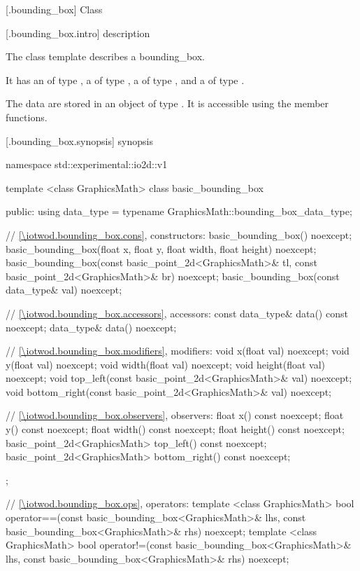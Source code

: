  [\iotwod.bounding_box] {Class }

 [\iotwod.bounding_box.intro] { description}

%
\pnum
The class template  describes a bounding_box.

\pnum
It has an  of type , a  of type , a  of type , and a  of type .

\pnum
The data are stored in an object of type . It is accessible using the  member functions.

 [\iotwod.bounding_box.synopsis] { synopsis}

\begin{codeblock}
namespace std::experimental::io2d::v1 {
  template <class GraphicsMath>
  class basic_bounding_box {
  public:
    using data_type = typename GraphicsMath::bounding_box_data_type;
    
    // \ref{\iotwod.bounding_box.cons}, constructors:
    basic_bounding_box() noexcept;
    basic_bounding_box(float x, float y, float width, float height) noexcept;
    basic_bounding_box(const basic_point_2d<GraphicsMath>& tl,
      const basic_point_2d<GraphicsMath>& br) noexcept;
    basic_bounding_box(const data_type& val) noexcept;

    // \ref{\iotwod.bounding_box.accessors}, accessors:
    const data_type& data() const noexcept;
    data_type& data() noexcept;

    // \ref{\iotwod.bounding_box.modifiers}, modifiers:
    void x(float val) noexcept;
    void y(float val) noexcept;
    void width(float val) noexcept;
    void height(float val) noexcept;
    void top_left(const basic_point_2d<GraphicsMath>& val) noexcept;
    void bottom_right(const basic_point_2d<GraphicsMath>& val) noexcept;

    // \ref{\iotwod.bounding_box.observers}, observers:
    float x() const noexcept;
    float y() const noexcept;
    float width() const noexcept;
    float height() const noexcept;
    basic_point_2d<GraphicsMath> top_left() const noexcept;
    basic_point_2d<GraphicsMath> bottom_right() const noexcept;
  };

  // \ref{\iotwod.bounding_box.ops}, operators:
  template <class GraphicsMath>
  bool operator==(const basic_bounding_box<GraphicsMath>& lhs,
    const basic_bounding_box<GraphicsMath>& rhs) noexcept;
  template <class GraphicsMath>
  bool operator!=(const basic_bounding_box<GraphicsMath>& lhs,
    const basic_bounding_box<GraphicsMath>& rhs) noexcept;
}
\end{codeblock}

